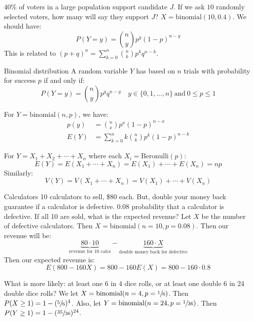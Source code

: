 \begin{exbox}{}{}
    $40\%$ of voters in a large population support candidate $J$. If we ask $10$ randomly selected voters, how many will say they support $J$?
    \tcblower
    $X = \text{binomial}(10, 0.4)$. We should have:
    \[ P(Y = y) = \binom{n}{y} p^y (1-p)^{n-y} \]
    This is related to $(p+q)^n = \sum_{k=0}^{n} \binom{n}{k} p^k q^{n-k}$.
\end{exbox}

\begin{dfnbox}{Binomial distribution}{}
    A random variable $Y$ has  based on $n$ trials with probability for success $p$ if and only if:
    \[ P(Y = y) = \binom{n}{y} p^y q^{n-y} \quad y \in \{0,1,\ldots,n\}\ \text{and}\ 0 \leq p \leq 1 \]
\end{dfnbox}

For $Y = \text{binomial}(n, p)$, we have:
\begin{align*}
    p(y) &= \binom{n}{x} p^x (1-p)^{n-x} \\
    E(Y) &= \sum_{k=0}^{n} k \binom{n}{k} p^k (1-p)^{n-k}
\end{align*}

For $Y = X_1 + X_2 + \cdots + X_n$ where each $X_i = \text{Beronulli}(p)$:
\[ E(Y) = E(X_1 + \cdots + X_n) = E(X_1) + \cdots + E(X_n) = np \]
Similarly:
\[ V(Y) = V(X_1 + \cdots + X_n) = V(X_1) + \cdots + V(X_n) \]

\begin{exbox}{Calculators}{}
    10 calculators to sell, \$80 each. But, double your money back guarantee if a calculator is defective. 0.08 probability that a calculator is defective. If all 10 are sold, what is the expected revenue?
    \tcblower
    Let $X$ be the number of defective calculators. Then $X = \text{binomial}(n = 10, p = 0.08)$. Then our revenue will be:
    \[ \underbrace{80 \cdot 10}_\text{revenue for 10 calcs} - \underbrace{160 \cdot X}_\text{double money back for defective} \]
    Then our expected revenue is:
    \[ E(800 - 160X) = 800 - 160E(X) = 800 - 160 \cdot 0.8 \]
\end{exbox}

\begin{exbox}{}{}
    What is more likely: at least one $6$ in 4 dice rolls, or at least one double 6 in 24 double dice rolls?
    \tcblower
    We let $X = \text{binomial}(n=4, p = \sfrac{1}{6})$. Then $P(X \geq 1) = 1 - (\sfrac56)^4$. Also, let $Y = \text{binomial}(n = 24, p = \sfrac{1}{36})$. Then $P(Y \geq 1) = 1 - (\sfrac{35}{36})^{24}$.
\end{exbox}

